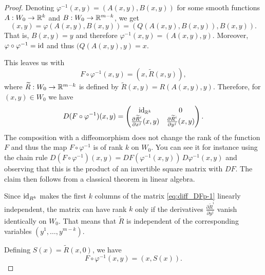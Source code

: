 \begin{proof}
  Denoting $\varphi^{-1}(x,y) = (A(x,y), B(x,y))$ for some smooth functions
  $A : W_0 \to \mathbb{R}^k$ and $B : W_0 \to \mathbb{R}^{m-k}$, we get
  \begin{equation}
    (x,y) = \varphi(A(x,y), B(x,y)) = (Q(A(x,y), B(x,y)), B(x,y)).
  \end{equation}
  That is, $B(x,y) = y$ and therefore $\varphi^{-1}(x,y) = (A(x,y), y)$.
  Moreover, $\varphi \circ \varphi^{-1} = \operatorname{id}$ and thus $(Q(A(x,y),y) = x$.

  This leaves us with
  \begin{equation}
    F\circ\varphi^{-1}(x,y) = (x, \widetilde{R}(x,y)),
  \end{equation}
  where $\widetilde{R} : W_0 \to\mathbb{R}^{m-k}$ is defined by $\widetilde{R}(x,y) = R(A(x,y), y)$.
  Therefore, for $(x,y)\in W_0$ we have
  \begin{equation}\label{eq:diff_DFp-1}
    D(F\circ\varphi^{-1})(x,y) = \begin{pmatrix}
      \operatorname{id}_{\mathbb{R}^k} & 0 \\
      \frac{\partial\widetilde{R}^i}{\partial x^j}(x,y) & \frac{\partial\widetilde{R}^i}{\partial y^j}(x,y)
    \end{pmatrix}.
  \end{equation}
  The composition with a diffeomorphism does not change the rank of the function $F$ and
  thus the map $F\circ\varphi^{-1}$ is of rank $k$ on $W_0$.
  You can see it for instance using the chain rule
  $D(F\circ\varphi^{-1})(x,y) = DF(\varphi^{-1}(x,y))\, D\varphi^{-1}(x,y)$ and
  observing that this is the product of an invertible square matrix with $DF$.
  The claim then follows from a classical theorem in linear algebra.

  Since $\operatorname{id}_{R^k}$ makes the first $k$ columns of the matrix \eqref{eq:diff_DFp-1}
  linearly independent, the matrix can have rank $k$ only if the derivatives 
  $\frac{\partial \widetilde{R}^i}{\partial y^j}$ vanish identically on $W_0$.
  That means that $\widetilde{R}$ is independent of the corresponding variables
  $(y^1, \ldots, y^{m-k})$.
  
  Defining $S(x) = \widetilde{R}(x, 0)$, we have
  \begin{equation}
    F\circ\varphi^{-1}(x,y) = (x, S(x)).
  \end{equation}


\end{proof}
